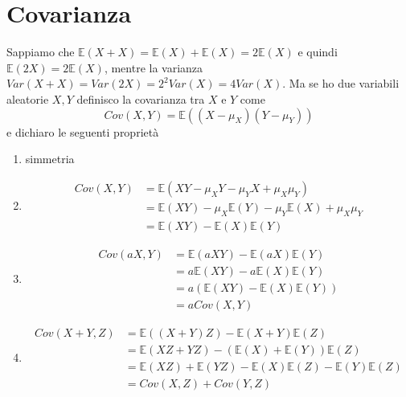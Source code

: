 \documentclass[11pt]{report}
\begin{document}
\section{Covarianza}
Sappiamo che $\mathbb{E}(X + X) = \mathbb{E}(X) + \mathbb{E}(X) = 2\mathbb{E}(X)$ e quindi $\mathbb{E}(2X) = 2\mathbb{E}(X)$, mentre la varianza $Var(X + X) = Var(2X) = 2^2Var(X) = 4Var(X)$. Ma se ho due variabili aleatorie $X,Y$ definisco la covarianza tra $X$ e $Y$ come
\begin{equation}
    Cov(X,Y) = \mathbb{E}((X - \mu_X)(Y - \mu_Y))    
\end{equation}
e dichiaro le seguenti proprietà
\begin{enumerate}
	\item simmetria
	\item
    \begin{equation}
        \begin{split}
            Cov(X,Y) & = \mathbb{E}(XY - \mu_XY - \mu_YX + \mu_X\mu_Y)\\
    		& = \mathbb{E}(XY) - \mu_X\mathbb{E}(Y) - \mu_Y\mathbb{E}(X) + \mu_X\mu_Y\\
    		& = \mathbb{E}(XY) - \mathbb{E}(X)\mathbb{E}(Y)
        \end{split}
    \end{equation}
	\item
        \begin{equation}
            \begin{split}
                Cov(aX,Y) & = \mathbb{E}(aXY) - \mathbb{E}(aX)\mathbb{E}(Y)\\
        		& = a\mathbb{E}(XY) - a\mathbb{E}(X)\mathbb{E}(Y)\\
        		& = a(\mathbb{E}(XY) - \mathbb{E}(X)\mathbb{E}(Y))\\
        		& = aCov(X,Y)
            \end{split}
        \end{equation}
	\item
        \begin{equation}
            \begin{split}
                Cov(X + Y,Z) & = \mathbb{E}((X+Y)Z) - \mathbb{E}(X+Y)\mathbb{E}(Z)\\
        		& = \mathbb{E}(XZ + YZ) - (\mathbb{E}(X) + \mathbb{E}(Y))\mathbb{E}(Z)\\
        		& = \mathbb{E}(XZ) + \mathbb{E}(YZ) - \mathbb{E}(X)\mathbb{E}(Z) - \mathbb{E}(Y)\mathbb{E}(Z)\\
        		& = Cov(X,Z) + Cov(Y,Z)

\end{split}
\end{equation}
\end{enumerate}
\end{document}
